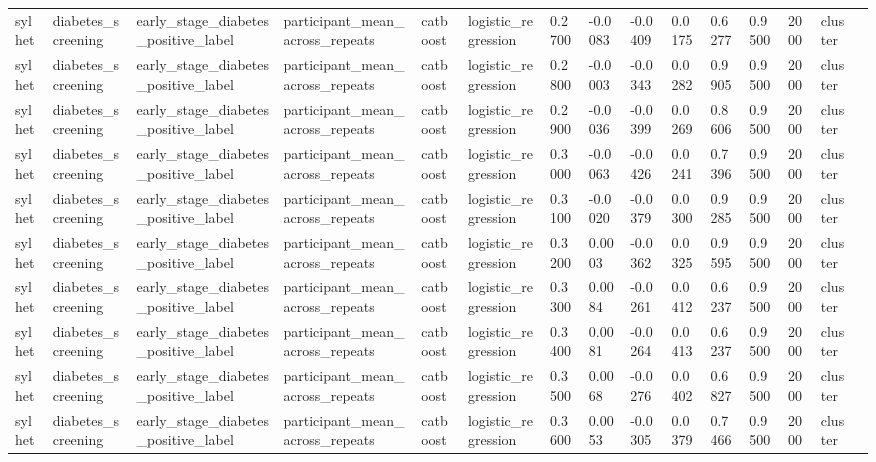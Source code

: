 \begin{tabular}{lllllllllllllll}
sylhet & diabetes\_screening & early\_stage\_diabetes\_positive\_label & participant\_mean\_across\_repeats & catboost & logistic\_regression & 0.2700 & -0.0083 & -0.0409 & 0.0175 & 0.6277 & 0.9500 & 2000 & cluster &  \\
sylhet & diabetes\_screening & early\_stage\_diabetes\_positive\_label & participant\_mean\_across\_repeats & catboost & logistic\_regression & 0.2800 & -0.0003 & -0.0343 & 0.0282 & 0.9905 & 0.9500 & 2000 & cluster &  \\
sylhet & diabetes\_screening & early\_stage\_diabetes\_positive\_label & participant\_mean\_across\_repeats & catboost & logistic\_regression & 0.2900 & -0.0036 & -0.0399 & 0.0269 & 0.8606 & 0.9500 & 2000 & cluster &  \\
sylhet & diabetes\_screening & early\_stage\_diabetes\_positive\_label & participant\_mean\_across\_repeats & catboost & logistic\_regression & 0.3000 & -0.0063 & -0.0426 & 0.0241 & 0.7396 & 0.9500 & 2000 & cluster &  \\
sylhet & diabetes\_screening & early\_stage\_diabetes\_positive\_label & participant\_mean\_across\_repeats & catboost & logistic\_regression & 0.3100 & -0.0020 & -0.0379 & 0.0300 & 0.9285 & 0.9500 & 2000 & cluster &  \\
sylhet & diabetes\_screening & early\_stage\_diabetes\_positive\_label & participant\_mean\_across\_repeats & catboost & logistic\_regression & 0.3200 & 0.0003 & -0.0362 & 0.0325 & 0.9595 & 0.9500 & 2000 & cluster &  \\
sylhet & diabetes\_screening & early\_stage\_diabetes\_positive\_label & participant\_mean\_across\_repeats & catboost & logistic\_regression & 0.3300 & 0.0084 & -0.0261 & 0.0412 & 0.6237 & 0.9500 & 2000 & cluster &  \\
sylhet & diabetes\_screening & early\_stage\_diabetes\_positive\_label & participant\_mean\_across\_repeats & catboost & logistic\_regression & 0.3400 & 0.0081 & -0.0264 & 0.0413 & 0.6237 & 0.9500 & 2000 & cluster &  \\
sylhet & diabetes\_screening & early\_stage\_diabetes\_positive\_label & participant\_mean\_across\_repeats & catboost & logistic\_regression & 0.3500 & 0.0068 & -0.0276 & 0.0402 & 0.6827 & 0.9500 & 2000 & cluster &  \\
sylhet & diabetes\_screening & early\_stage\_diabetes\_positive\_label & participant\_mean\_across\_repeats & catboost & logistic\_regression & 0.3600 & 0.0053 & -0.0305 & 0.0379 & 0.7466 & 0.9500 & 2000 & cluster &  \\

\end{tabular}
